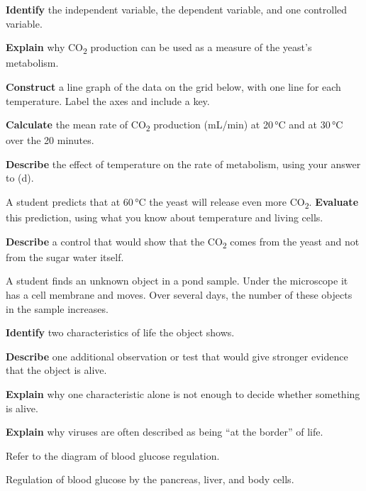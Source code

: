 \documentclass[11pt,letterpaper]{article}
\begin{document}
\begin{parts}
  \item \textbf{Identify} the independent variable, the dependent variable, and one controlled variable.
  \item \textbf{Explain} why CO\textsubscript{2} production can be used as a measure of the yeast's metabolism.
  \item \textbf{Construct} a line graph of the data on the grid below, with one line for each temperature. Label the axes and include a key.

  \graphgrid
  \item \textbf{Calculate} the mean rate of CO\textsubscript{2} production (mL/min) at 20\,°C and at 30\,°C over the 20 minutes.
  \item \textbf{Describe} the effect of temperature on the rate of metabolism, using your answer to (d).
  \item A student predicts that at 60\,°C the yeast will release even more CO\textsubscript{2}. \textbf{Evaluate} this prediction, using what you know about temperature and living cells.
  \item \textbf{Describe} a control that would show that the CO\textsubscript{2} comes from the yeast and not from the sugar water itself.
\end{parts}


A student finds an unknown object in a pond sample. Under the microscope it has a cell membrane and moves. Over several days, the number of these objects in the sample increases.

\begin{parts}
  \item \textbf{Identify} two characteristics of life the object shows.
  \item \textbf{Describe} one additional observation or test that would give stronger evidence that the object is alive.
  \item \textbf{Explain} why one characteristic alone is not enough to decide whether something is alive.
  \item \textbf{Explain} why viruses are often described as being ``at the border'' of life.
\end{parts}


Refer to the diagram of blood glucose regulation.

  {Regulation of blood glucose by the pancreas, liver, and body cells.}
\end{document}
